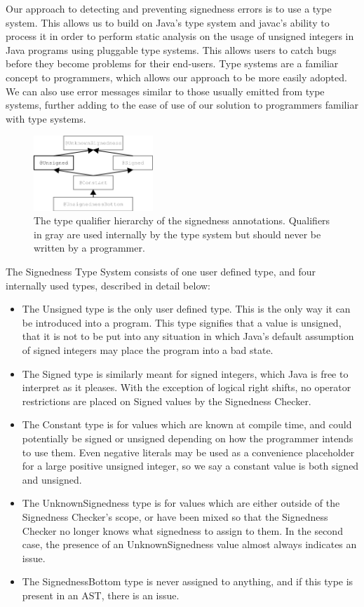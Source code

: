 \documentclass{sig-alternate-05-2015}
\begin{document}
Our approach to detecting and preventing signedness errors is to use a type system. This allows us to build on Java's type system and javac's ability to process it in order to perform static analysis on the usage of unsigned integers in Java programs using pluggable type systems. This allows users to catch bugs before they become problems for their end-users. Type systems are a familiar concept to programmers, which allows our approach to be more easily adopted. We can also use error messages similar to those usually emitted from type systems, further adding to the ease of use of our solution to programmers familiar with type systems.

\begin{figure}
    \centering
    \includegraphics[width=0.4\textwidth]{unsignedness}
    \caption{The type qualifier hierarchy of the signedness annotations.
Qualifiers in gray are used internally by the type system but should never be written by a programmer.}
    \label{fig:my_label}
\end{figure}

The Signedness Type System consists of one user defined type, and four internally used types, described in detail below:

\begin{itemize}
  \item The Unsigned type is the only user defined type. This is the only way it can be introduced into a program. This type signifies that a value is unsigned, that it is not to be put into any situation in which Java's default assumption of signed integers may place the program into a bad state.
  \item The Signed type is similarly meant for signed integers, which Java is free to interpret as it pleases. With the exception of logical right shifts, no operator restrictions are placed on Signed values by the Signedness Checker.
  \item The Constant type is for values which are known at compile time, and could potentially be signed or unsigned depending on how the programmer intends to use them. Even negative literals may be used as a convenience placeholder for a large positive unsigned integer, so we say a constant value is both signed and unsigned.
  \item The UnknownSignedness type is for values which are either outside of the Signedness Checker's scope, or have been mixed so that the Signedness Checker no longer knows what signedness to assign to them. In the second case, the presence of an UnknownSignedness value almost always indicates an issue.
  \item The SignednessBottom type is never assigned to anything, and if this type is present in an AST, there is an issue.
\end{itemize}
\end{document}
